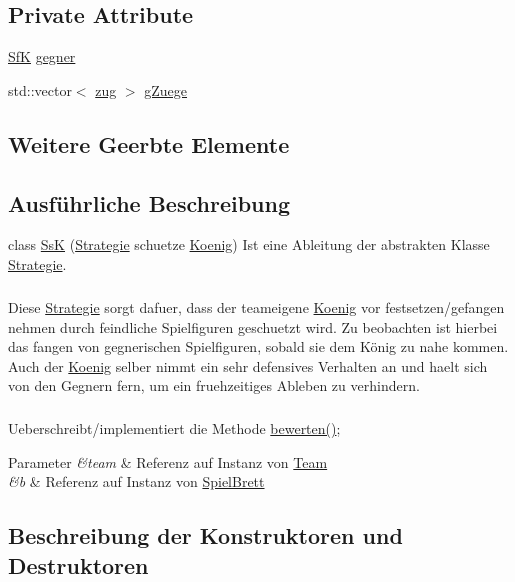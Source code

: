 \subsection*{Private Attribute}
\begin{DoxyCompactItemize}
\item 
\hyperlink{class_sf_k}{Sf\+K} \hyperlink{class_ss_k_a4c117e68ae76434738995801a4a1fbcc}{gegner}
\item 
std\+::vector$<$ \hyperlink{structzug}{zug} $>$ \hyperlink{class_ss_k_af5cfdbc60256434dbb73e61e737e056a}{g\+Zuege}
\end{DoxyCompactItemize}
\subsection*{Weitere Geerbte Elemente}


\subsection{Ausführliche Beschreibung}
class \hyperlink{class_ss_k}{Ss\+K} (\hyperlink{class_strategie}{Strategie} schuetze \hyperlink{class_koenig}{Koenig}) Ist eine Ableitung der abstrakten Klasse \hyperlink{class_strategie}{Strategie}. \subparagraph*{}

Diese \hyperlink{class_strategie}{Strategie} sorgt dafuer, dass der teameigene \hyperlink{class_koenig}{Koenig} vor festsetzen/gefangen nehmen durch feindliche Spielfiguren geschuetzt wird. Zu beobachten ist hierbei das fangen von gegnerischen Spielfiguren, sobald sie dem König zu nahe kommen. Auch der \hyperlink{class_koenig}{Koenig} selber nimmt ein sehr defensives Verhalten an und haelt sich von den Gegnern fern, um ein fruehzeitiges Ableben zu verhindern. \subparagraph*{}

Ueberschreibt/implementiert die Methode \hyperlink{class_ss_k_aac922686e66332aae431ec05d06937a0}{bewerten()}; 
\begin{DoxyParams}{Parameter}
{\em \&team} & Referenz auf Instanz von \hyperlink{class_team}{Team} \\
\hline
{\em \&b} & Referenz auf Instanz von \hyperlink{class_spiel_brett}{Spiel\+Brett} \\
\hline
\end{DoxyParams}


\subsection{Beschreibung der Konstruktoren und Destruktoren}
\hypertarget{class_ss_k_a2cb13922fb8c0bdbad4dd36f98c0448b}{}

